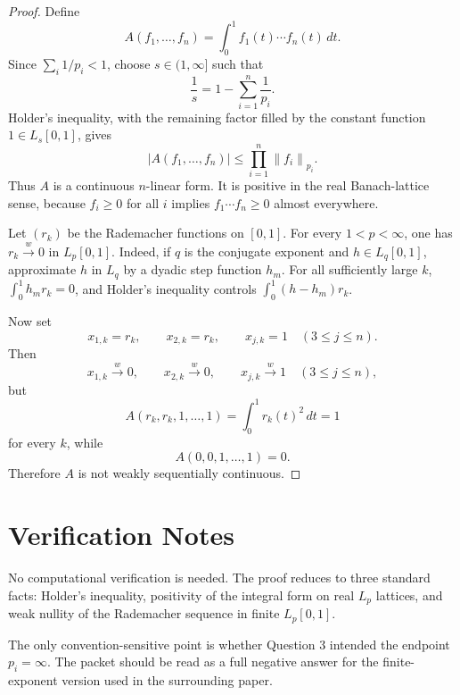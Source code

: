 \documentclass[11pt]{article}
\newcommand{\norm}[1]{\left\lVert #1 \right\rVert}
\newcommand{\weak}{\xrightarrow{w}}
\begin{document}
\begin{proof}
Define
\[
  A(f_1,\ldots,f_n)=\int_0^1 f_1(t)\cdots f_n(t)\,dt.
\]
Since $\sum_i 1/p_i<1$, choose $s\in(1,\infty]$ such that
\[
  \frac1s=1-\sum_{i=1}^n \frac1{p_i}.
\]
Holder's inequality, with the remaining factor filled by the constant
function $1\in L_s[0,1]$, gives
\[
  |A(f_1,\ldots,f_n)|
  \le \prod_{i=1}^n \norm{f_i}_{p_i}.
\]
Thus $A$ is a continuous $n$-linear form. It is positive in the real
Banach-lattice sense, because $f_i\ge 0$ for all $i$ implies
$f_1\cdots f_n\ge 0$ almost everywhere.

Let $(r_k)$ be the Rademacher functions on $[0,1]$. For every
$1<p<\infty$, one has $r_k\weak 0$ in $L_p[0,1]$. Indeed, if $q$ is the
conjugate exponent and $h\in L_q[0,1]$, approximate $h$ in $L_q$ by a
dyadic step function $h_m$. For all sufficiently large $k$,
$\int_0^1 h_m r_k=0$, and Holder's inequality controls
$\int_0^1 (h-h_m)r_k$.

Now set
\[
  x_{1,k}=r_k,\qquad x_{2,k}=r_k,\qquad x_{j,k}=1\quad (3\le j\le n).
\]
Then
\[
  x_{1,k}\weak 0,\qquad x_{2,k}\weak 0,\qquad x_{j,k}\weak 1
  \quad (3\le j\le n),
\]
but
\[
  A(r_k,r_k,1,\ldots,1)=\int_0^1 r_k(t)^2\,dt=1
\]
for every $k$, while
\[
  A(0,0,1,\ldots,1)=0.
\]
Therefore $A$ is not weakly sequentially continuous.
\end{proof}

\section*{Verification Notes}

No computational verification is needed. The proof reduces to three
standard facts: Holder's inequality, positivity of the integral form on
real $L_p$ lattices, and weak nullity of the Rademacher sequence in finite
$L_p[0,1]$.

The only convention-sensitive point is whether Question 3 intended the
endpoint $p_i=\infty$. The packet should be read as a full negative answer
for the finite-exponent version used in the surrounding paper.
\end{document}
